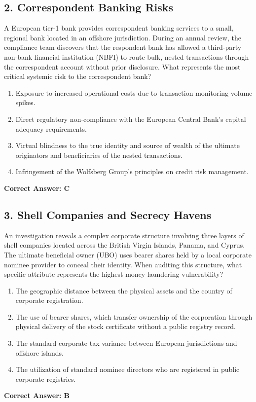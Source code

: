 \documentclass[11pt,a4paper]{article}
\begin{document}
	\subsection{2. Correspondent Banking Risks}
	A European tier-1 bank provides correspondent banking services to a small, regional bank located in an offshore jurisdiction. During an annual review, the compliance team discovers that the respondent bank has allowed a third-party non-bank financial institution (NBFI) to route bulk, nested transactions through the correspondent account without prior disclosure. What represents the most critical systemic risk to the correspondent bank?
	\begin{enumerate}[label=\Alph*.]
		\item Exposure to increased operational costs due to transaction monitoring volume spikes.
		\item Direct regulatory non-compliance with the European Central Bank’s capital adequacy requirements.
		\item Virtual blindness to the true identity and source of wealth of the ultimate originators and beneficiaries of the nested transactions.
		\item Infringement of the Wolfsberg Group's principles on credit risk management.
	\end{enumerate}
	\textbf{Correct Answer: C}
	
	\subsection{3. Shell Companies and Secrecy Havens}
	An investigation reveals a complex corporate structure involving three layers of shell companies located across the British Virgin Islands, Panama, and Cyprus. The ultimate beneficial owner (UBO) uses bearer shares held by a local corporate nominee provider to conceal their identity. When auditing this structure, what specific attribute represents the highest money laundering vulnerability?
	\begin{enumerate}[label=\Alph*.]
		\item The geographic distance between the physical assets and the country of corporate registration.
		\item The use of bearer shares, which transfer ownership of the corporation through physical delivery of the stock certificate without a public registry record.
		\item The standard corporate tax variance between European jurisdictions and offshore islands.
		\item The utilization of standard nominee directors who are registered in public corporate registries.
	\end{enumerate}
	\textbf{Correct Answer: B}
	
\end{document}
